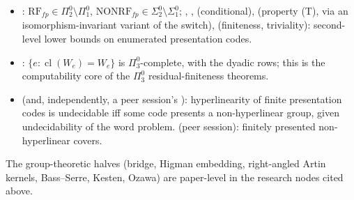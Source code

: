 \documentclass[11pt]{article}
\theoremstyle{definition}
\newcommand{\Pizt}{\Pi^0_2}\newcommand{\Sizt}{\Sigma^0_2}\newcommand{\Pith}{\Pi^0_3}\newcommand{\Sith}{\Sigma^0_3}
\newcommand{\Sio}{\Sigma^0_1}\newcommand{\Pio}{\Pi^0_1}
\newcommand{\cl}{\operatorname{cl}}
\begin{document}
\begin{itemize}
\item {}: $\mathrm{RF}_{fp}\in\Pizt\setminus\Pio$, $\mathrm{NONRF}_{fp}\in\Sizt\setminus\Sio$; , ,  (conditional),  (property (T), via an isomorphism-invariant variant of the switch),  (finiteness, triviality): second-level lower bounds on enumerated presentation codes.
\item {}: $\{e:\cl(W_e)=W_e\}$ is $\Pith$-complete, with the dyadic rows; this is the computability core of the $\Pith$ residual-finiteness theorems.
\item {} (and, independently, a peer session's ): hyperlinearity of finite presentation codes is undecidable iff some code presents a non-hyperlinear group, given undecidability of the word problem.  (peer session): finitely presented non-hyperlinear covers.
\end{itemize}
The group-theoretic halves (bridge, Higman embedding, right-angled Artin kernels, Bass--Serre, Kesten, Ozawa) are paper-level in the research nodes cited above.
\end{document}

